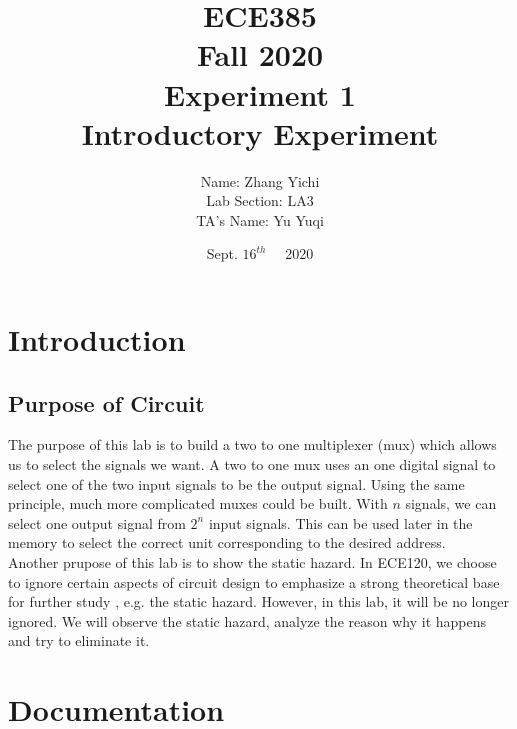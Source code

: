 \documentclass[12pt]{article}
\title{
    \textbf{\Huge ECE385} \\
    \huge Fall 2020 \\
    \huge Experiment 1 \\[120pt]
    \textbf{\Huge Introductory Experiment} \\[120pt]
    }
\author{
    \large Name: Zhang Yichi \\
    \large Lab Section: LA3 \\
    \large TA's Name: Yu Yuqi
    }
\date{Sept. $16^{th}\quad$ 2020}
\begin{document}
\maketitle
\newpage

\section{Introduction}
\subsection{\textbf{Purpose of Circuit}}
The purpose of this lab is to build a two to one multiplexer (mux) which allows us to select the signals we want. A two to one mux uses an one digital signal to select one of the two input signals to be the output signal. Using the same principle, much more complicated muxes could be built. With $n$ signals, we can select one output signal from $2^n$ input signals. This can be used later in the memory to select the correct unit corresponding to the desired address. \\

\noindent
Another prupose of this lab is to show the static hazard. In ECE120, we choose to ignore certain aspects of circuit design to emphasize a strong theoretical base for further study \cite{GG}, e.g. the static hazard. However, in this lab, it will be no longer ignored. We will observe the static hazard, analyze the reason why it happens and try to eliminate it.

\section{Documentation}
\end{document}
